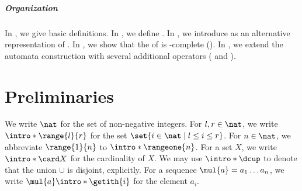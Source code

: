 \begin{scope}
%
%
%
%

\subparagraph*{Organization}
In , we give basic definitions.
In , we define .
In , we introduce  as an alternative representation of .
In ,
we show that the  of  is -complete ().
In , we extend the automata construction with several additional operators ( and ).
\end{scope}
 
%

\section{Preliminaries}\label{section: preliminaries}
We write $\nat$ for the set of non-negative integers.
\AP
For $l, r \in \nat$, we write $\intro*\range{l}{r}$ for the set $\set{i \in \nat \mid l \le i \le r}$.
\AP
For $n \in \nat$, we abbreviate $\range{1}{n}$ to $\intro*\rangeone{n}$.
\AP
For a set $X$,
we write $\intro*\card X$ for the cardinality of $X$. %
\AP
We may use $\intro*\dcup$ to denote that the union $\cup$ is disjoint, explicitly.
\AP For a sequence $\mul{a} = a_1 \dots a_n$,
we write $\mul{a}\intro*\getith{i}$ for the element $a_i$.

